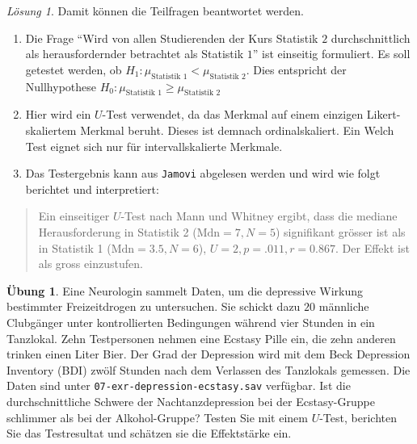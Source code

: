 \documentclass[
]{book}
\providecommand{\tightlist}{%
  \setlength{\itemsep}{0pt}\setlength{\parskip}{0pt}}
\theoremstyle{definition}
\theoremstyle{definition}
\theoremstyle{definition}
\newtheorem{exercise}{Übung}[chapter]
\theoremstyle{definition}
\theoremstyle{remark}
\newtheorem*{solution}{Lösung}
\begin{document}
\begin{solution}
Damit können die Teilfragen beantwortet werden.

\begin{enumerate}
\def\labelenumi{\alph{enumi})}
\tightlist
\item
  Die Frage ``Wird von allen Studierenden der Kurs Statistik \(2\)
  durchschnittlich als herausfordernder betrachtet als Statistik \(1\)''
  ist einseitig formuliert. Es soll getestet werden, ob
  \(H_1: \mu_\text{Statistik 1} < \mu_\text{Statistik 2}\). Dies
  entspricht der Nullhypothese
  \(H_0: \mu_\text{Statistik 1} \geq \mu_\text{Statistik 2}\)
\item
  Hier wird ein \(U\)-Test verwendet, da das Merkmal auf einem einzigen
  Likert-skaliertem Merkmal beruht. Dieses ist demnach
  ordinalskaliert. Ein Welch Test eignet sich nur für
  intervallskalierte Merkmale.
\item
  Das Testergebnis kann aus \texttt{Jamovi} abgelesen werden und wird wie
  folgt berichtet und interpretiert:
\end{enumerate}

\begin{quote}
Ein einseitiger \(U\)-Test nach Mann und Whitney ergibt, dass die
mediane Herausforderung in Statistik 2 (\(\text{Mdn}=7, N = 5\))
signifikant grösser ist als in Statistik 1 (\(\text{Mdn}= 3.5, N =6\)),
\(U = 2, p = .011, r = 0.867\). Der Effekt ist als gross einzustufen.
\end{quote}

\end{solution}

\begin{exercise}
\protect\hypertarget{exr:depression-ecstasy}{}\label{exr:depression-ecstasy}Eine Neurologin sammelt Daten, um die depressive Wirkung bestimmter
Freizeitdrogen zu untersuchen. Sie schickt dazu \(20\) männliche
Clubgänger unter kontrollierten Bedingungen während vier Stunden in ein
Tanzlokal. Zehn Testpersonen nehmen eine Ecstasy Pille ein, die zehn
anderen trinken einen Liter Bier. Der Grad der Depression wird mit dem
Beck Depression Inventory (BDI) zwölf Stunden nach dem Verlassen des
Tanzlokals gemessen. Die Daten sind unter
\texttt{07-exr-depression-ecstasy.sav} verfügbar. Ist die
durchschnittliche Schwere der Nachtanzdepression bei der Ecstasy-Gruppe
schlimmer als bei der Alkohol-Gruppe? Testen Sie mit einem \(U\)-Test,
berichten Sie das Testresultat und schätzen sie die Effektstärke ein.
\end{exercise}
\end{document}
